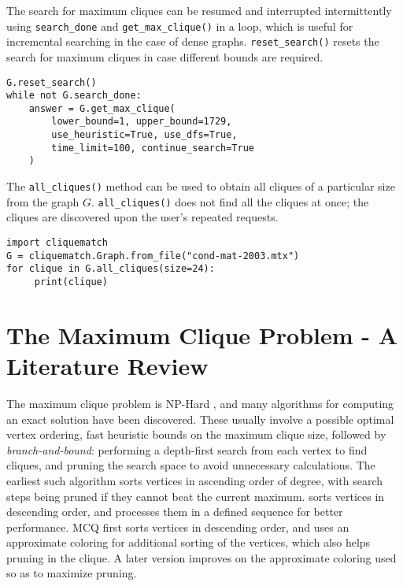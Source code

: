 \documentclass[12pt]{article}
\begin{document}
The search for maximum cliques can be resumed and interrupted intermittently using
\texttt{search\_done} and \texttt{get\_max\_clique()} in a loop, which is useful for
incremental searching in the case of dense graphs. \texttt{reset\_search()} resets the
search for maximum cliques in case different bounds are required.

\begin{verbatim}
G.reset_search() 
while not G.search_done: 
    answer = G.get_max_clique(
        lower_bound=1, upper_bound=1729,
        use_heuristic=True, use_dfs=True,
        time_limit=100, continue_search=True
    )
\end{verbatim}

The \texttt{all\_cliques()} method can be used to obtain all cliques of a particular size
from the graph $G$. \texttt{all\_cliques()} does not find all the
cliques at once; the cliques are discovered upon the user's repeated requests.

\begin{verbatim}
import cliquematch
G = cliquematch.Graph.from_file("cond-mat-2003.mtx")
for clique in G.all_cliques(size=24):
     print(clique)
\end{verbatim}

\section{The Maximum Clique Problem - A Literature Review}%
\label{sec:mcs}

The maximum clique problem is NP-Hard \citep{garey1979computers}, and many algorithms for
computing an exact solution have been discovered. These usually involve a possible
optimal vertex ordering, fast heuristic bounds on the maximum clique size, followed by
\textit{branch-and-bound}: performing a depth-first search from each vertex to find
cliques, and pruning the search space to avoid unnecessary calculations. The earliest
such algorithm \citep{carraghan1990} sorts vertices in ascending order of degree, with
search steps being pruned if they cannot beat the current maximum.
\cite{ostergaard2002} sorts vertices in descending order, and processes them in a
defined sequence for better performance. MCQ \citep{tomita2003} first sorts vertices
in descending order, and uses an approximate coloring for additional sorting of the
vertices, which also helps pruning in the clique.  A later version
\citep{tomita2010} improves on the approximate coloring used so as to maximize
pruning.
\end{document}
